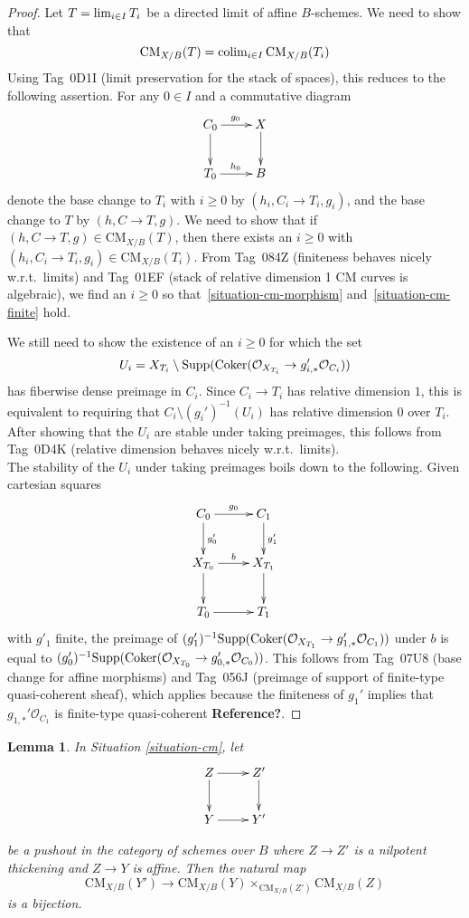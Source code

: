 \documentclass{stacks-project}
\theoremstyle{plain}
\newtheorem{lemma}[subsection]{Lemma}
\theoremstyle{definition}
\theoremstyle{remark}
\numberwithin{equation}{subsection}
\def\lim{\mathop{\rm lim}\nolimits}
\def\colim{\mathop{\rm colim}\nolimits}
\def\Coker{\mathop{\rm Coker}}
\def\CMfunctor{\mathcal{C}\!{\it oh}}
\def\CMfunctor{\text{CM}}
\begin{document}
\begin{proof}
Let $T = \lim_{i \in I} T_i$ be a directed limit of affine $B$-schemes. We need to show that
$$
\CMfunctor_{X/B}(T) = \colim_{i \in I} \CMfunctor_{X/B}(T_i)
$$
Using Tag~0D1I (limit preservation for the stack of spaces), this reduces to the following assertion. For any $0 \in I$ and a commutative diagram
$$
\xymatrix{
C_0 \ar[r]^{g_0} \ar[d] &X \ar[d] \\
T_0 \ar[r]^{h_0} & B
}
$$
    denote the base change to $T_i$ with $i \geq 0$ by $(h_i,C_i \rightarrow T_i,g_i)$, and the base change to $T$ by $(h,C \rightarrow T,g)$. We need to show that if $(h,C \rightarrow T,g) \in \CMfunctor_{X/B}(T)$, then there exists an $i \geq 0$ with $(h_i, C_i \rightarrow T_i, g_i) \in \CMfunctor_{X/B}(T_i)$. From Tag~084Z (finiteness behaves nicely w.r.t.\ limits) and Tag~01EF (stack of relative dimension 1 CM curves is algebraic), we find an $i \geq 0$ so that~\eqref{situation-cm-morphism} and~\eqref{situation-cm-finite} hold.

\medskip\noindent
We still need to show the existence of an $i \geq 0$ for which the set
$$
U_i = X_{T_i} \setminus \text{Supp}(\Coker(\mathcal{O}_{X_{T_i}} \rightarrow g'_{i,*} \mathcal{O}_{C_i}))
$$
has fiberwise dense preimage in $C_i$. Since $C_i \rightarrow T_i$ has relative dimension $1$, this is equivalent to requiring that $C_i \setminus (g_i')^{-1} (U_i)$ has relative dimension $0$ over $T_i$. After showing that the $U_i$ are stable under taking preimages, this follows from Tag~0D4K (relative dimension behaves nicely w.r.t.\ limits). \\
The stability of the $U_i$ under taking preimages boils down to the following. Given cartesian squares
$$
\xymatrix{
C_0 \ar[r]^{g_0} \ar[d]^{g_0'} &C_1 \ar[d]^{g_1'} \\
X_{T_0} \ar[d] \ar[r]^{b} & X_{T_1} \ar[d] \\
T_0 \ar[r] &T_1
}
$$
with $g'_1$ finite, the preimage of $(g'_1)^{-1} \text{Supp}( \Coker(\mathcal{O}_{X_{T_1}} \rightarrow g'_{1,*} \mathcal{O}_{C_1}))$ under $b$ is equal to $(g'_0)^{-1} \text{Supp}( \Coker(\mathcal{O}_{X_{T_0}} \rightarrow g'_{0,*} \mathcal{O}_{C_0}))$. This follows from Tag~07U8 (base change for affine morphisms) and Tag~056J (preimage of support of finite-type quasi-coherent sheaf), which applies because the finiteness of $g_1'$ implies that $g_{1,*}' \mathcal{O}_{C_1}$ is finite-type quasi-coherent {\bfseries Reference?}.
\end{proof}


\begin{lemma}
In Situation \ref{situation-cm}, let 
$$
\xymatrix{
Z \ar[r] \ar[d] & Z' \ar[d] \\
Y \ar[r] & Y'}
$$

be a pushout in the category of schemes over $B$ where $Z\to Z'$ is a nilpotent thickening and $Z \to Y$ is affine. Then the natural map
$$
\CMfunctor_{X/B}(Y') \longrightarrow \CMfunctor_{X/B}(Y) \times_{\CMfunctor_{X/B}(Z')} \CMfunctor_{X/B}(Z)
$$ is a bijection.

\label{lemma-cm-RS-star}
\end{lemma}
\end{document}
